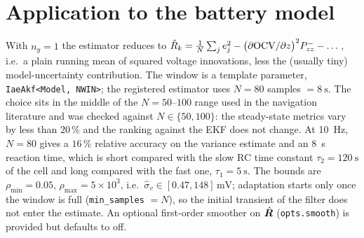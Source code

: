 \section{Application to the battery model}
With $n_y=1$ the estimator reduces to
$\hat R_k = \frac{1}{N}\sum_j e_j^2 - \big(\partial\mathrm{OCV}/\partial z\big)^2 P^-_{zz}
- \dots$, i.e.\ a plain running mean of squared voltage innovations, less the (usually tiny)
model-uncertainty contribution.  The window is a template parameter, \texttt{IaeAkf<Model, NWIN>};
the registered estimator uses $N = 80$ samples $=\SI{8}{\second}$.  The choice sits in the middle
of the $N=50$--$100$ range used in the navigation literature and was checked against $N\in\{50,100\}$:
the steady-state metrics vary by less than $20\,\%$ and the ranking against the EKF does not change.
At \SI{10}{\hertz}, $N=80$ gives a $16\,\%$ relative accuracy on the variance estimate and an
\SI{8}{\second} reaction time, which is short compared with the slow RC time constant
$\tau_2=\SI{120}{\second}$ of the cell and long compared with the fast one, $\tau_1=\SI{5}{\second}$.
The bounds are $\rho_{\min}=0.05$, $\rho_{\max}=5\times10^3$, i.e.\
$\hat\sigma_v\in[0.47,148]\,\si{\milli\volt}$; adaptation starts only once the window is full
(\texttt{min\_samples} $=N$), so the initial transient of the filter does not enter the estimate.
An optional first-order smoother on $\hat{\bm{R}}$ (\texttt{opts.smooth}) is provided but defaults to
off.

